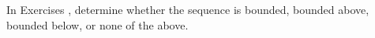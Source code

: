 {\noindent In Exercises}
{, determine whether the sequence is bounded, bounded above, bounded below, or none of the above.}
